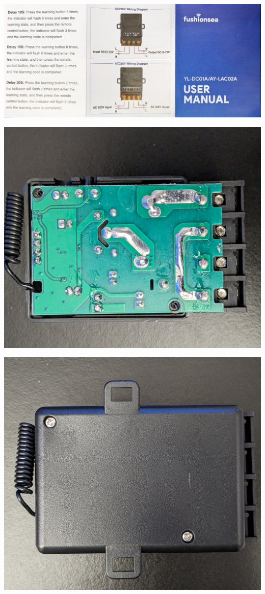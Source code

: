 \documentclass{beamer}
\begin{document}
\begin{frame}
\includegraphics[width=\textwidth]{../Pics/device/manual_front.jpg}
\end{frame}

\begin{frame}
\includegraphics[width=\textwidth]{../Pics/device/relay_back_bare.jpg}
\end{frame}

\begin{frame}
\includegraphics[width=\textwidth]{../Pics/device/relay_back_case.jpg}
\end{frame}
\end{document}
